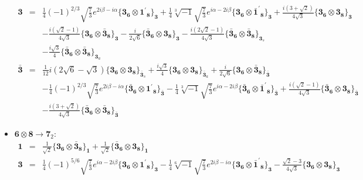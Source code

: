 \documentclass[english]{article}
\newcommand{\subcg}[3]{\big\{ {#1}\otimes{#2}\big\}^{}_{#3}}
\newcommand{\rep}[1]{\mathbf{#1}}
\begin{document}
\begin{itemize}
\begin{eqnarray*}
\\
\rep{3} &=& \frac{1}{4} (-1)^{2/3} \sqrt{\frac{7}{3}} e^{2 i \beta -i \alpha }\subcg{\rep{3}_{\rep{6}}}{\rep{1^{\prime}}_{\rep{8}}}{\rep{3}}+\frac{1}{4} \sqrt[3]{-1} \sqrt{\frac{7}{3}} e^{i \alpha -2 i \beta }\subcg{\rep{3}_{\rep{6}}}{\rep{\bar{1}^{\prime}}_{\rep{8}}}{\rep{3}}+\frac{i \left(3+\sqrt{2}\right)}{4 \sqrt{3}}\subcg{\rep{3}_{\rep{6}}}{\rep{3}_{\rep{8}}}{\rep{3}} \\ 
 & & -\frac{i \left(\sqrt{2}-1\right)}{4 \sqrt{3}}\subcg{\rep{3}_{\rep{6}}}{\rep{\bar{3}}_{\rep{8}}}{\rep{3}}-\frac{i}{2 \sqrt{6}}\subcg{\rep{\bar{3}}_{\rep{6}}}{\rep{3}_{\rep{8}}}{\rep{3}}-\frac{i \left(2 \sqrt{2}-1\right)}{4 \sqrt{3}}\subcg{\rep{\bar{3}}_{\rep{6}}}{\rep{\bar{3}}_{\rep{8}}}{\rep{3}_{s}} \\ 
 & & -\frac{i \sqrt{3}}{4}\subcg{\rep{\bar{3}}_{\rep{6}}}{\rep{\bar{3}}_{\rep{8}}}{\rep{3}_{a}}
\\
\rep{\bar{3}} &=& \frac{1}{12} i \left(2 \sqrt{6}-\sqrt{3}\right)\subcg{\rep{3}_{\rep{6}}}{\rep{3}_{\rep{8}}}{\rep{\bar{3}}_{s}}+\frac{i \sqrt{3}}{4}\subcg{\rep{3}_{\rep{6}}}{\rep{3}_{\rep{8}}}{\rep{\bar{3}}_{a}}+\frac{i}{2 \sqrt{6}}\subcg{\rep{3}_{\rep{6}}}{\rep{\bar{3}}_{\rep{8}}}{\rep{\bar{3}}} \\ 
 & & -\frac{1}{4} (-1)^{2/3} \sqrt{\frac{7}{3}} e^{2 i \beta -i \alpha }\subcg{\rep{\bar{3}}_{\rep{6}}}{\rep{1^{\prime}}_{\rep{8}}}{\rep{\bar{3}}}-\frac{1}{4} \sqrt[3]{-1} \sqrt{\frac{7}{3}} e^{i \alpha -2 i \beta }\subcg{\rep{\bar{3}}_{\rep{6}}}{\rep{\bar{1}^{\prime}}_{\rep{8}}}{\rep{\bar{3}}}+\frac{i \left(\sqrt{2}-1\right)}{4 \sqrt{3}}\subcg{\rep{\bar{3}}_{\rep{6}}}{\rep{3}_{\rep{8}}}{\rep{\bar{3}}} \\ 
 & & -\frac{i \left(3+\sqrt{2}\right)}{4 \sqrt{3}}\subcg{\rep{\bar{3}}_{\rep{6}}}{\rep{\bar{3}}_{\rep{8}}}{\rep{\bar{3}}}
\end{eqnarray*}
\item $\rep{6}\otimes\rep{8}\to\rep{7}_{2}$:
\begin{eqnarray*}
\rep{1} &=& \frac{1}{\sqrt{2}}\subcg{\rep{3}_{\rep{6}}}{\rep{\bar{3}}_{\rep{8}}}{\rep{1}}+\frac{1}{\sqrt{2}}\subcg{\rep{\bar{3}}_{\rep{6}}}{\rep{3}_{\rep{8}}}{\rep{1}}
\\
\rep{3} &=& \frac{1}{4} (-1)^{5/6} \sqrt{\frac{7}{3}} e^{i \alpha -2 i \beta }\subcg{\rep{3}_{\rep{6}}}{\rep{1^{\prime}}_{\rep{8}}}{\rep{3}}-\frac{1}{4} \sqrt[6]{-1} \sqrt{\frac{7}{3}} e^{2 i \beta -i \alpha }\subcg{\rep{3}_{\rep{6}}}{\rep{\bar{1}^{\prime}}_{\rep{8}}}{\rep{3}}-\frac{\sqrt{2}-3}{4 \sqrt{3}}\subcg{\rep{3}_{\rep{6}}}{\rep{3}_{\rep{8}}}{\rep{3}} \\ 

\end{eqnarray*}
\end{itemize}
\end{document}
